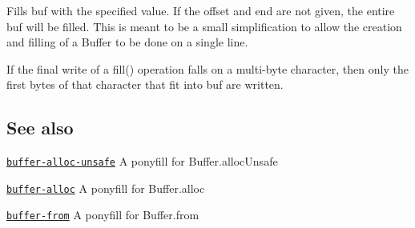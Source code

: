 Fills {\ttfamily buf} with the specified {\ttfamily value}. If the {\ttfamily offset} and {\ttfamily end} are not given, the entire {\ttfamily buf} will be filled. This is meant to be a small simplification to allow the creation and filling of a {\ttfamily Buffer} to be done on a single line.

If the final write of a {\ttfamily fill()} operation falls on a multi-\/byte character, then only the first bytes of that character that fit into {\ttfamily buf} are written.

\subsection*{See also}


\begin{DoxyItemize}
\item \href{https://github.com/LinusU/buffer-alloc-unsafe}{\tt buffer-\/alloc-\/unsafe} A ponyfill for {\ttfamily Buffer.\+alloc\+Unsafe}
\item \href{https://github.com/LinusU/buffer-alloc}{\tt buffer-\/alloc} A ponyfill for {\ttfamily Buffer.\+alloc}
\item \href{https://github.com/LinusU/buffer-from}{\tt buffer-\/from} A ponyfill for {\ttfamily Buffer.\+from} 
\end{DoxyItemize}